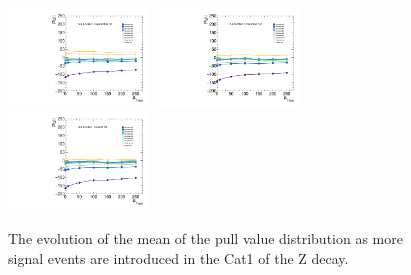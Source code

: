 \begin{figure}[!ht]
  \includegraphics[width=0.33\textwidth]{Fig/BiasStudy/Linearity/ZJpsiG_Cat1/pull_mean_linearity_TrueFunc6}~
  \includegraphics[width=0.33\textwidth]{Fig/BiasStudy/Linearity/ZJpsiG_Cat1/pull_mean_linearity_TrueFunc7}~
  \includegraphics[width=0.33\textwidth]{Fig/BiasStudy/Linearity/ZJpsiG_Cat1/pull_mean_linearity_TrueFunc8}\\
  \caption{The evolution of the mean of the pull value distribution as more signal events are introduced in the Cat1 of the Z decay.}
  \label{fig:Linearity_mean_ZJpsiG_Cat1}
\end{figure}
\clearpage
%
